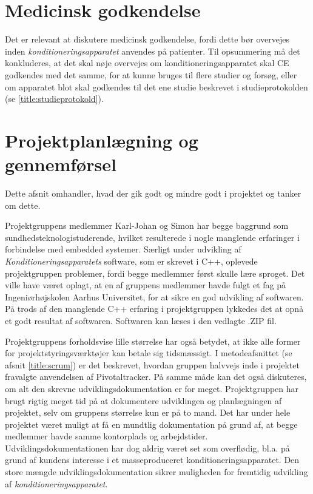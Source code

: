 \section{Medicinsk godkendelse}
Det er relevant at diskutere medicinsk godkendelse, fordi dette bør overvejes inden \textit{konditioneringsapparatet} anvendes på patienter. Til opsummering må det konkluderes, at det skal nøje overvejes om konditioneringsapparatet skal CE godkendes med det samme, for at kunne bruges til flere studier og forsøg, eller om apparatet blot skal godkendes til det ene studie beskrevet i studieprotokolden (se \ref{title:studieprotokold}).

\section{Projektplanlægning og gennemførsel}
Dette afsnit omhandler, hvad der gik godt og mindre godt i projektet og tanker om dette.

Projektgruppens medlemmer Karl-Johan og Simon har begge baggrund som sundhedsteknologistuderende, hvilket resulterede i nogle manglende erfaringer i forbindelse med embedded systemer. Særligt under udvikling af \textit{Konditioneringsapparatets} software, som er skrevet i C++, oplevede projektgruppen problemer, fordi begge medlemmer først skulle lære sproget. Det ville have været oplagt, at en af gruppens medlemmer havde fulgt et fag på Ingeniørhøjskolen Aarhus Universitet, for at sikre en god udvikling af softwaren. På trods af den manglende C++ erfaring i projektgruppen lykkedes det at opnå et godt resultat af softwaren. Softwaren kan læses i den vedlagte .ZIP fil.

Projektgruppens forholdsvise lille størrelse har også betydet, at ikke alle former for projektstyringsværktøjer kan betale sig tidsmæssigt. I metodeafsnittet (se afsnit \ref{title:scrum}) er det beskrevet, hvordan gruppen halvvejs inde i projektet fravalgte anvendelsen af Pivotaltracker. På samme måde kan det også diskuteres, om alt den skrevne udviklingsdokumentation er for meget. Projektgruppen har brugt rigtig meget tid på at dokumentere udviklingen og planlægningen af projektet, selv om gruppens størrelse kun er på to mand. Det har under hele projektet været muligt at få en mundtlig dokumentation på grund af, at begge medlemmer havde samme kontorplads og arbejdstider.
Udviklingsdokumentationen har dog aldrig været set som overflødig, bl.a. på grund af kundens interesse i et masseproduceret konditioneringsapparatet. Den store mængde udviklingsdokumentation sikrer muligheden for fremtidig udvikling af \textit{konditioneringsapparatet}. 

